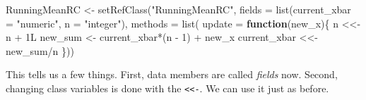 \documentclass[
  12pt,
  krantz2]{krantz}
\makeatletter
\newenvironment{Shaded}{\begin{snugshade}}{\end{snugshade}}
\newcommand{\AttributeTok}[1]{\textcolor[rgb]{0.61,0.61,0.61}{#1}}
\newcommand{\ControlFlowTok}[1]{\textcolor[rgb]{0.27,0.27,0.27}{\textbf{#1}}}
\newcommand{\DecValTok}[1]{\textcolor[rgb]{0.06,0.06,0.06}{#1}}
\newcommand{\DocumentationTok}[1]{\textcolor[rgb]{0.37,0.37,0.37}{\textbf{\textit{#1}}}}
\newcommand{\FloatTok}[1]{\textcolor[rgb]{0.06,0.06,0.06}{#1}}
\newcommand{\FunctionTok}[1]{\textcolor[rgb]{0,0,0}{#1}}
\newcommand{\NormalTok}[1]{#1}
\newcommand{\OtherTok}[1]{\textcolor[rgb]{0.37,0.37,0.37}{#1}}
\newcommand{\SpecialCharTok}[1]{\textcolor[rgb]{0,0,0}{#1}}
\newcommand{\StringTok}[1]{\textcolor[rgb]{0.5,0.5,0.5}{#1}}
\newenvironment{kframe}{%
\medskip{}
\setlength{\fboxsep}{.8em}
 \def\at@end@of@kframe{}%
 \ifinner\ifhmode%
  \def\at@end@of@kframe{\end{minipage}}%
  \begin{minipage}{\columnwidth}%
 \fi\fi%
 \def\FrameCommand##1{\hskip\@totalleftmargin \hskip-\fboxsep
 \colorbox{shadecolor}{##1}\hskip-\fboxsep
     \hskip-\linewidth \hskip-\@totalleftmargin \hskip\columnwidth}%
 \MakeFramed {\advance\hsize-\width
   \@totalleftmargin\z@ \linewidth\hsize
   \@setminipage}}%
 {\par\unskip\endMakeFramed%
 \at@end@of@kframe}
\renewenvironment{Shaded}{\begin{kframe}}{\end{kframe}}
\makeatother
\begin{document}
\begin{Shaded}
\begin{Highlighting}[]
\NormalTok{RunningMeanRC }\OtherTok{\textless{}{-}} \FunctionTok{setRefClass}\NormalTok{(}\StringTok{"RunningMeanRC"}\NormalTok{, }
                             \AttributeTok{fields =} \FunctionTok{list}\NormalTok{(}\AttributeTok{current\_xbar =} \StringTok{"numeric"}\NormalTok{,}
                                           \AttributeTok{n =} \StringTok{"integer"}\NormalTok{),}
                             \AttributeTok{methods =} \FunctionTok{list}\NormalTok{(}
                               \AttributeTok{update =} \ControlFlowTok{function}\NormalTok{(new\_x)\{}
\NormalTok{                                 n }\OtherTok{\textless{}\textless{}{-}}\NormalTok{ n }\SpecialCharTok{+}\NormalTok{ 1L}
\NormalTok{                                 new\_sum }\OtherTok{\textless{}{-}}\NormalTok{ current\_xbar}\SpecialCharTok{*}\NormalTok{(n }\SpecialCharTok{{-}} \DecValTok{1}\NormalTok{) }\SpecialCharTok{+}\NormalTok{ new\_x}
\NormalTok{                                 current\_xbar }\OtherTok{\textless{}\textless{}{-}}\NormalTok{ new\_sum}\SpecialCharTok{/}\NormalTok{n}
\NormalTok{                                \}))}
\end{Highlighting}
\end{Shaded}

This tells us a few things. First, data members are called \emph{fields} now. Second, changing class variables is done with the \texttt{\textless{}\textless{}-}. We can use it just as before.

\begin{Shaded}
\end{Shaded}
\end{document}
